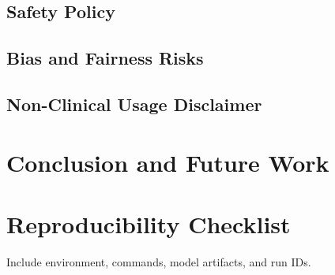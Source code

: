 \documentclass[11pt,a4paper]{article}
\begin{document}
\subsection{Safety Policy}
\subsection{Bias and Fairness Risks}
\subsection{Non-Clinical Usage Disclaimer}

\section{Conclusion and Future Work}




\appendix
\section{Reproducibility Checklist}
Include environment, commands, model artifacts, and run IDs.
\end{document}
